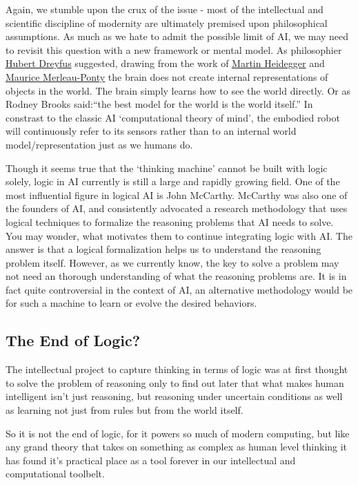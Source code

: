 \documentclass[]{book}
\theoremstyle{definition}
\theoremstyle{definition}
\theoremstyle{definition}
\theoremstyle{remark}
\begin{document}
Again, we stumble upon the crux of the issue - most of the intellectual
and scientific discipline of modernity are ultimately premised upon
philosophical assumptions. As much as we hate to admit the possible
limit of AI, we may need to revisit this question with a new framework
or mental model. As philosophier
\href{https://en.wikipedia.org/wiki/Hubert_Dreyfus}{Hubert Dreyfus}
suggested, drawing from the work of
\href{https://en.wikipedia.org/wiki/Martin_Heidegger}{Martin Heidegger}
and \href{https://en.wikipedia.org/wiki/Maurice_Merleau-Ponty}{Maurice
Merleau-Ponty} the brain does not create internal representations of
objects in the world. The brain simply learns how to see the world
directly. Or as Rodney Brooks said:``the best model for the world is the
world itself.'' In constrast to the classic AI `computational theory of
mind', the embodied robot will continuously refer to its sensors rather
than to an internal world model/representation just as we humans do.

Though it seems true that the `thinking machine' cannot be built with
logic solely, logic in AI currently is still a large and rapidly growing
field. One of the most influential figure in logical AI is John
McCarthy. McCarthy was also one of the founders of AI, and consistently
advocated a research methodology that uses logical techniques to
formalize the reasoning problems that AI needs to solve. You may wonder,
what motivates them to continue integrating logic with AI. The answer is
that a logical formalization helps us to understand the reasoning
problem itself. However, as we currently know, the key to solve a
problem may not need an thorough understanding of what the reasoning
problems are. It is in fact quite controversial in the context of AI, an
alternative methodology would be for such a machine to learn or evolve
the desired behaviors.

\subsection{The End of Logic?}\label{the-end-of-logic}

The intellectual project to capture thinking in terms of logic was at
first thought to solve the problem of reasoning only to find out later
that what makes human intelligent isn't just reasoning, but reasoning
under uncertain conditions as well as learning not just from rules but
from the world itself.

So it is not the end of logic, for it powers so much of modern
computing, but like any grand theory that takes on something as complex
as human level thinking it has found it's practical place as a tool
forever in our intellectual and computational toolbelt.
\end{document}
